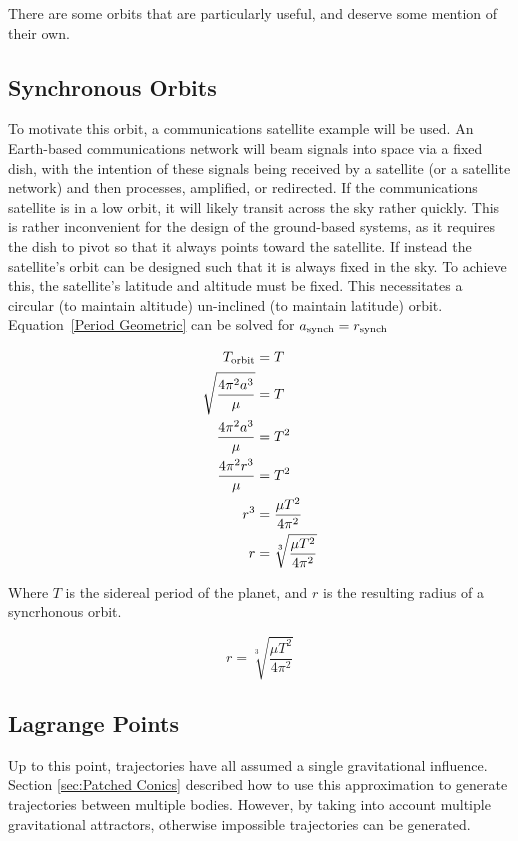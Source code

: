 \documentclass[../basicOrbitalDynamics.tex]{subfiles}
\begin{document}
There are some orbits that are particularly useful, and deserve some mention of their own.

\bigskip\bigskip
\subsection{Synchronous Orbits}\label{Synchronous Orbits}

To motivate this orbit, a communications satellite example will be used. An Earth-based communications network will beam signals into space via a fixed dish, with the intention of these signals being received by a satellite (or a satellite network) and then processes, amplified, or redirected. If the communications satellite is in a low orbit, it will likely transit across the sky rather quickly. This is rather inconvenient for the design of the ground-based systems, as it requires the dish to pivot so that it always points toward the satellite. If instead the satellite's orbit can be designed such that it is always fixed in the sky. To achieve this, the satellite's latitude and altitude must be fixed. This necessitates a circular (to maintain altitude) un-inclined (to maintain latitude) orbit. Equation~\eqref{Period Geometric} can be solved for ${a}_\text{synch}={r}_\text{synch}$

\begin{align*}
    {T}_\text{orbit}& = T  \\
    \sqrt{\frac{4\pi^2 a^3}{\mu}} & = T  \\
    \frac{4\pi^2 a^3}{\mu} & = T^2\\
    \frac{4\pi^2 r^3}{\mu} & = T^2\\
    r^3& = \frac{\mu T^2}{4\pi^2} \\
    r  & = \sqrt[3]{\frac{\mu T^2}{4\pi^2}} \\
\end{align*}

Where $T$ is the sidereal period of the planet, and $r$ is the resulting radius of a syncrhonous orbit.

\begin{equation}\label{Syncrhonous Orbit}
    r = \sqrt[3]{\frac{\mu T^2}{4\pi^2}}
\end{equation}

\bigskip\bigskip
\subsection{Lagrange Points}\label{sec:Lagrange Points}

Up to this point, trajectories have all assumed a single gravitational influence. Section \ref{sec:Patched Conics} described how to use this approximation to generate trajectories between multiple bodies. However, by taking into account multiple gravitational attractors, otherwise impossible trajectories can be generated.
\end{document}
